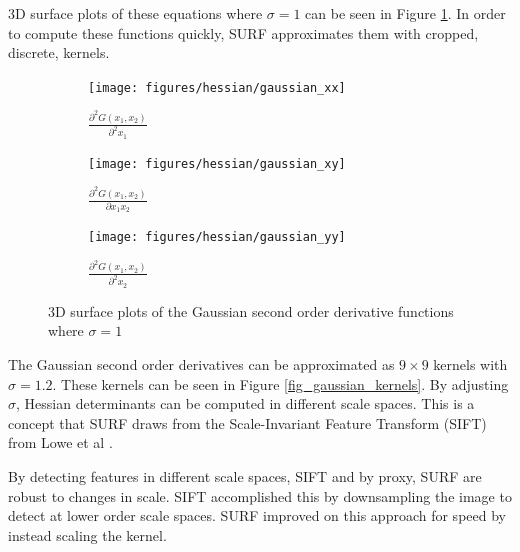 \documentclass{article}
\begin{document}
3D surface plots of these equations where $\sigma=1$ can be seen in Figure \ref{fig_gaussian_surface_plots}. In order to compute these functions quickly, SURF approximates them with cropped, discrete, kernels. 

\begin{figure}[h]
	\centering
	\begin{subfigure}[b]{0.45\textwidth}
		\centering
		\texttt{[image: figures/hessian/gaussian\_xx]}
		\caption{$\frac{\partial^2 G(x_1, x_2)}{\partial^2 x_1}$}
	\end{subfigure}
	\begin{subfigure}[b]{0.45\textwidth}
		\centering
		\texttt{[image: figures/hessian/gaussian\_xy]}
		\caption{$\frac{\partial^2 G(x_1, x_2)}{\partial x_1 x_2}$}
	\end{subfigure}
	\begin{subfigure}[b]{0.45\textwidth}
		\centering
		\texttt{[image: figures/hessian/gaussian\_yy]}
		\caption{$\frac{\partial^2 G(x_1, x_2)}{\partial^2 x_2}$}
	\end{subfigure}
	\caption{3D surface plots of the Gaussian second order derivative functions where $\sigma=1$}
	\label{fig_gaussian_surface_plots}
\end{figure}

The Gaussian second order derivatives can be approximated as $9 \times 9$ kernels with $\sigma=1.2$. These kernels can be seen in Figure \ref{fig_gaussian_kernels}. By adjusting $\sigma$, Hessian determinants can be computed in different scale spaces. This is a concept that SURF draws from the Scale-Invariant Feature Transform (SIFT) from Lowe et al \cite{lowe_distinctive_2004}.

 By detecting features in different scale spaces, SIFT and by proxy, SURF are robust to changes in scale. SIFT accomplished this by downsampling the image to detect at lower order scale spaces. SURF improved on this approach for speed by instead scaling the kernel.
\end{document}

